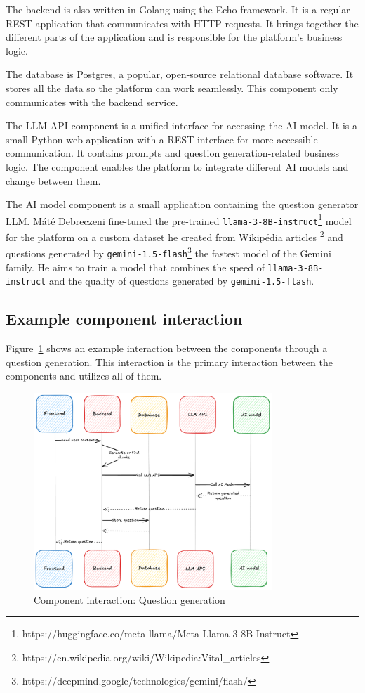 The backend is also written in Golang using the Echo framework. It is a regular REST application that communicates with HTTP requests. It brings together the different parts of the application and is responsible for the platform's business logic.

The database is Postgres, a popular, open-source relational database software. It stores all the data so the platform can work seamlessly. This component only communicates with the backend service.

The LLM API component is a unified interface for accessing the AI model. It is a small Python web application with a REST interface for more accessible communication. It contains prompts and question generation-related business logic. The component enables the platform to integrate different AI models and change between them.

The AI model component is a small application containing the question generator LLM. Máté Debreczeni fine-tuned the pre-trained \texttt{llama-3-8B-instruct}\footnote{https://huggingface.co/meta-llama/Meta-Llama-3-8B-Instruct} model for the platform on a custom dataset he created from Wikipédia articles \footnote{https://en.wikipedia.org/wiki/Wikipedia:Vital_articles} and questions generated by \texttt{gemini-1.5-flash}\footnote{https://deepmind.google/technologies/gemini/flash/} the fastest model of the Gemini family. He aims to train a model that combines the speed of \texttt{llama-3-8B-instruct} and the quality of questions generated by \texttt{gemini-1.5-flash}.

\subsection{Example component interaction}

Figure~\ref{fig:component-interaction} shows an example interaction between the components through a question generation. This interaction is the primary interaction between the components and utilizes all of them.

\begin{figure}[!h]
    \centering
    \includegraphics[width=0.8\textwidth, keepaspectratio]{figures/component-interaction.png}
    \caption{Component interaction: Question generation}
    \label{fig:component-interaction}
\end{figure}


